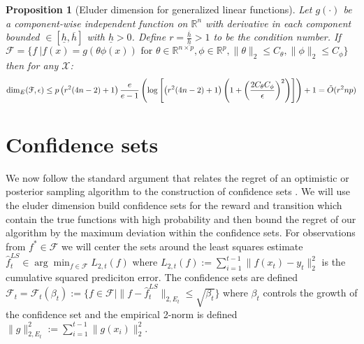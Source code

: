 \documentclass{article}
\newtheorem{prop}{Proposition}
\newcommand{\Real}{\mathds{R}}
\newcommand{\Xc}{\mathcal{X}}
\newcommand{\Fc}{\mathcal{F}}
\begin{document}
\begin{prop}[Eluder dimension for generalized linear functions]
\hspace{0.00000000000001mm} \newline
Let $g(\cdot)$ be a component-wise independent function on $\Real^n$ with derivative in each component bounded  $\in [\underline{h},\overline{h}]$ with $\underline{h}>0$.
Define $r = \frac{\overline{h}}{\underline{h}} > 1$ to be the condition number.
If $\mathcal{F} = \{ f \ | f(x) = g(\theta \phi(x))  \text{ for } \theta \in \Real^{n \times p}, \phi \in \Real^p ,
\|\theta \|_2 \le C_\theta , \|\phi\|_2 \le C_\phi \}$
then for any $\Xc$:
{\small
$${\rm dim}_E(\Fc, \epsilon) \le p \left(r^2(4n-2)+1\right)\frac{e}{e-1} \left(\log \left[\left(r^2(4n-2)+1 \right) \left(1+ \left(\frac{2C_\theta C_\phi}{\epsilon} \right)^2\right) \right] \right) + 1 = \tilde{O}(r^2 np)$$
}
\end{prop}

\section{Confidence sets}
\label{sec: conf}
We now follow the standard argument that relates the regret of an optimistic or posterior sampling algorithm to the construction of confidence sets \cite{jaksch2010near,osband2013more}.
We will use the eluder dimension build confidence sets for the reward and transition which contain the true functions with high probability and then bound the regret of our algorithm by the maximum deviation within the confidence sets.
For observations from $f^* \in \Fc$ we will center the sets around the least squares estimate $\hat{f}_t^{LS} \in \arg \min_{f \in \Fc} L_{2,t}(f)$ where $L_{2,t}(f) := \sum_{i=1}^{t-1} \|f(x_t) - y_t \|^2_2$ is the cumulative squared prediciton error.
The confidence sets are defined $\Fc_t = \Fc_t(\beta_t) := \{ f \in \Fc | \| f-\hat{f}_t^{LS} \|_{2,E_t} \le \sqrt{\beta_t} \}$ where $\beta_t$ controls the growth of the confidence set and the empirical 2-norm is defined $\|g\|_{2,E_t}^2 := \sum_{i=1}^{t-1} \|g(x_i)\|_2^2$.
\end{document}
